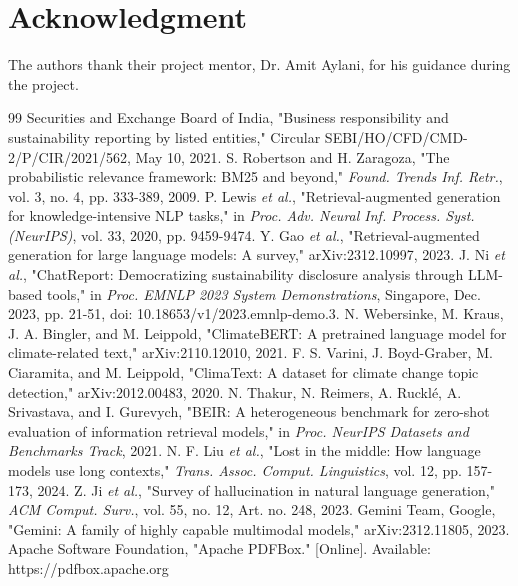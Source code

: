 \documentclass[conference]{IEEEtran}
\begin{document}
\section*{Acknowledgment}The authors thank their project mentor, Dr. Amit Aylani, for his guidance during the project.
\begin{thebibliography}{99}
 Securities and Exchange Board of India, "Business responsibility and sustainability reporting by listed entities," Circular SEBI/HO/CFD/CMD-2/P/CIR/2021/562, May 10, 2021.
 S. Robertson and H. Zaragoza, "The probabilistic relevance framework: BM25 and beyond," \textit{Found. Trends Inf. Retr.}, vol. 3, no. 4, pp. 333-389, 2009.
 P. Lewis \textit{et al.}, "Retrieval-augmented generation for knowledge-intensive NLP tasks," in \textit{Proc. Adv. Neural Inf. Process. Syst. (NeurIPS)}, vol. 33, 2020, pp. 9459-9474.
 Y. Gao \textit{et al.}, "Retrieval-augmented generation for large language models: A survey," arXiv:2312.10997, 2023.
 J. Ni \textit{et al.}, "ChatReport: Democratizing sustainability disclosure analysis through LLM-based tools," in \textit{Proc. EMNLP 2023 System Demonstrations}, Singapore, Dec. 2023, pp. 21-51, doi: 10.18653/v1/2023.emnlp-demo.3.
 N. Webersinke, M. Kraus, J. A. Bingler, and M. Leippold, "ClimateBERT: A pretrained language model for climate-related text," arXiv:2110.12010, 2021.
 F. S. Varini, J. Boyd-Graber, M. Ciaramita, and M. Leippold, "ClimaText: A dataset for climate change topic detection," arXiv:2012.00483, 2020.
 N. Thakur, N. Reimers, A. Ruckl\'e, A. Srivastava, and I. Gurevych, "BEIR: A heterogeneous benchmark for zero-shot evaluation of information retrieval models," in \textit{Proc. NeurIPS Datasets and Benchmarks Track}, 2021.
 N. F. Liu \textit{et al.}, "Lost in the middle: How language models use long contexts," \textit{Trans. Assoc. Comput. Linguistics}, vol. 12, pp. 157-173, 2024.
 Z. Ji \textit{et al.}, "Survey of hallucination in natural language generation," \textit{ACM Comput. Surv.}, vol. 55, no. 12, Art. no. 248, 2023.
 Gemini Team, Google, "Gemini: A family of highly capable multimodal models," arXiv:2312.11805, 2023.
 Apache Software Foundation, "Apache PDFBox." [Online]. Available: https://pdfbox.apache.org
\end{thebibliography}
\end{document}
